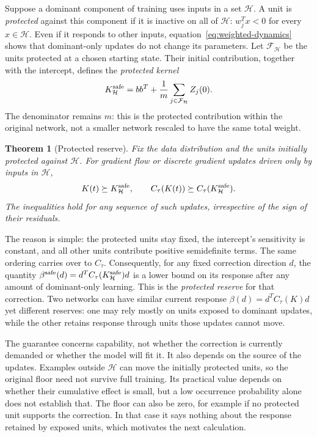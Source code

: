 \documentclass[11pt,a4paper]{article}
\newtheorem{theorem}{Theorem}
\begin{document}
Suppose a dominant component of training uses inputs in a set $\mathcal H$. A unit is \emph{protected} against this component if it is inactive on all of $\mathcal H$: $w_j^Tx<0$ for every $x\in\mathcal H$. Even if it responds to other inputs, equation~\eqref{eq:weighted-dynamics} shows that dominant-only updates do not change its parameters. Let $\mathcal F_{\mathcal H}$ be the units protected at a chosen starting state. Their initial contribution, together with the intercept, defines the \emph{protected kernel}
\begin{equation}
 K_{\mathcal H}^{\rm safe}=bb^T+\frac1m\sum_{j\in\mathcal F_{\mathcal H}}Z_j(0).
 \label{eq:safe}
\end{equation}
The denominator remains $m$: this is the protected contribution within the original network, not a smaller network rescaled to have the same total weight.

\begin{theorem}[Protected reserve]\label{thm:reserve}
Fix the data distribution and the units initially protected against $\mathcal H$. For gradient flow or discrete gradient updates driven only by inputs in $\mathcal H$,
\begin{equation}
 K(t)\succeq K_{\mathcal H}^{\rm safe},\qquad
 C_\tau(K(t))\succeq C_\tau(K_{\mathcal H}^{\rm safe}).
 \label{eq:reserve-bound}
\end{equation}
The inequalities hold for any sequence of such updates, irrespective of the sign of their residuals.
\end{theorem}

The reason is simple: the protected units stay fixed, the intercept's sensitivity is constant, and all other units contribute positive semidefinite terms. The same ordering carries over to $C_\tau$. Consequently, for any fixed correction direction $d$, the quantity $\beta^{\rm safe}(d)=d^TC_\tau(K_{\mathcal H}^{\rm safe})d$ is a lower bound on its response after any amount of dominant-only learning. This is the \emph{protected reserve} for that correction. Two networks can have similar current response $\beta(d)=d^TC_\tau(K)d$ yet different reserves: one may rely mostly on units exposed to dominant updates, while the other retains response through units those updates cannot move.

The guarantee concerns capability, not whether the correction is currently demanded or whether the model will fit it. It also depends on the source of the updates. Examples outside $\mathcal H$ can move the initially protected units, so the original floor need not survive full training. Its practical value depends on whether their cumulative effect is small, but a low occurrence probability alone does not establish that. The floor can also be zero, for example if no protected unit supports the correction. In that case it says nothing about the response retained by exposed units, which motivates the next calculation.
\end{document}
